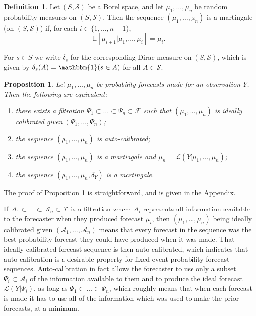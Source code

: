 \documentclass[aap]{imsart}
\theoremstyle{plain}
\newtheorem{proposition}[theorem]{Proposition}
\theoremstyle{definition}
\newtheorem{definition}[theorem]{Definition}
\begin{document}
\begin{definition}\label{martingale}
  Let $(S,\mathcal{S})$ be a Borel space, and let $\mu_1, \ldots, \mu_n$ be random probability measures on $(S,\mathcal{S})$. Then the sequence $(\mu_1, \ldots, \mu_n)$ is a martingale (on $(S,\mathcal{S})$) if, for each $i \in \{1,\ldots,n-1\}$,
  \begin{equation*}
    \mathbb{E}[\mu_{i+1}|\mu_1,\ldots,\mu_i] = \mu_i.
  \end{equation*}
\end{definition}

For $s \in S$ we write $\delta_s$ for the corresponding Dirac measure on $(S,\mathcal{S})$, which is given by $\delta_s(A) = \mathbbm{1}(s \in A)$ for all $A \in \mathcal{S}$.

\begin{proposition}\label{auto-calibration_equivalence}
  Let $\mu_1, \ldots, \mu_n$ be probability forecasts made for an observation $Y$. Then the following are equivalent:
  \begin{enumerate}[label=(\roman*)]
  \item there exists a filtration $\Psi_1 \subset \ldots \subset \Psi_n \subset \mathcal{F}$ such that $(\mu_1, \ldots, \mu_n)$ is ideally calibrated given $(\Psi_1, \ldots, \Psi_n)$;
  \item the sequence $(\mu_1, \ldots, \mu_n)$ is auto-calibrated;
  \item the sequence $(\mu_1, \ldots, \mu_n)$ is a martingale and $\mu_n = \mathcal{L}(Y|\mu_1, \ldots, \mu_n)$;
  \item the sequence $(\mu_1, \ldots, \mu_n, \delta_Y)$ is a martingale.
\end{enumerate}
\end{proposition}

The proof of Proposition \ref{auto-calibration_equivalence} is straightforward, and is given in the \hyperref[appn]{Appendix}.

If $\mathcal{A}_1 \subset \ldots \subset \mathcal{A}_n \subset \mathcal{F}$ is a filtration where $\mathcal{A}_i$ represents all information available to the forecaster when they produced forecast $\mu_i$, then $(\mu_1, \ldots, \mu_n)$ being ideally calibrated given $(\mathcal{A}_1, \ldots, \mathcal{A}_n)$ means that every forecast in the sequence was the best probability forecast they could have produced when it was made. That ideally calibrated forecast sequence is then auto-calibrated, which indicates that auto-calibration is a desirable property for fixed-event probability forecast sequences. Auto-calibration in fact allows the forecaster to use only a subset $\Psi_i \subset \mathcal{A}_i$ of the information available to them and to produce the ideal forecast $\mathcal{L}(Y|\Psi_i)$, as long as $\Psi_1 \subset \ldots \subset \Psi_n$, which roughly means that when each forecast is made it has to use all of the information which was used to make the prior forecasts, at a minimum.
\end{document}
